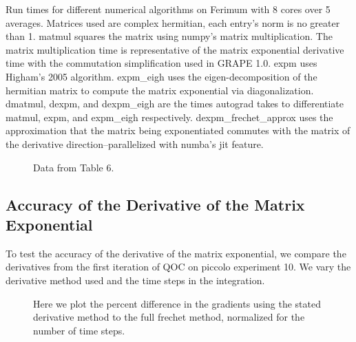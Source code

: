 \documentclass[letterpaper, 12pt]{article}
\begin{document}
\begin{table}[h]
  \caption{Run times for different numerical algorithms on Ferimum with 8 cores over 5 averages. Matrices
    used are complex hermitian, each entry's norm is no greater than 1.
    matmul squares the matrix using numpy's matrix multiplication.
    The matrix multiplication
    time is representative of the matrix exponential derivative time
    with the commutation simplification used in
    GRAPE 1.0. expm uses Higham's 2005 algorithm.
    expm\_eigh uses the eigen-decomposition of the hermitian matrix to compute the
    matrix exponential via diagonalization.
    dmatmul, dexpm, and dexpm\_eigh are the times autograd takes to differentiate
    matmul, expm, and expm\_eigh respectively.
    dexpm\_frechet\_approx uses the approximation that the matrix being exponentiated commutes with the matrix of
    the derivative direction--parallelized with numba's jit feature.}
\end{table}

\begin{figure}[h]
  \begin{center}
    \caption{Data from Table 6.}
  \end{center}
\end{figure}


\subsection{Accuracy of the Derivative of the Matrix Exponential}
To test the accuracy of the derivative of the matrix exponential,
we compare the derivatives from the first iteration of QOC on
piccolo experiment 10. We vary the derivative method used and the
time steps in the integration.

\begin{figure}[h]
  \begin{center}
    \caption{Here we plot the percent difference in the gradients
      using the stated derivative method to the full frechet method,
      normalized for the number of time steps.}
  \end{center}
\end{figure}




\end{document}
